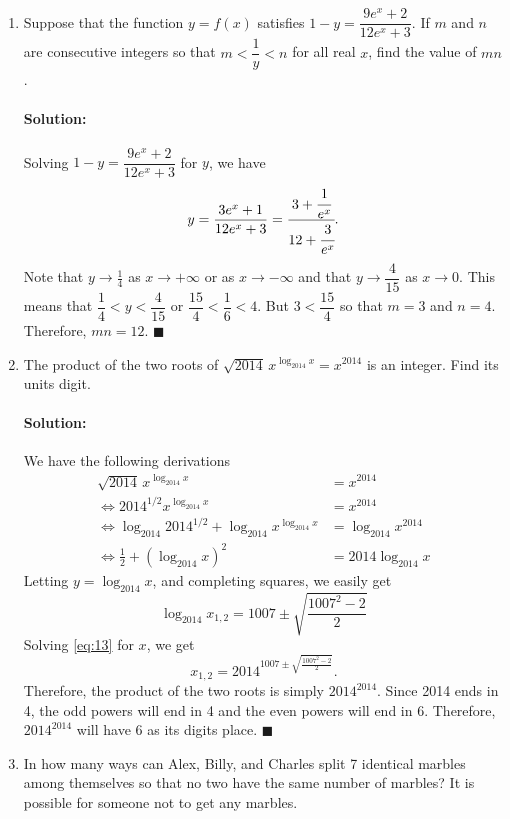 \documentclass{article}
\newenvironment{solution}{\paragraph{Solution:}}{\hfill$\blacksquare$}
\begin{document}
\begin{enumerate}
	\item Suppose that the function $y=f(x)$ satisfies $1-y=\dfrac{9e^x + 2}{12e^x+3}$. If $m$ and $n$ are consecutive integers so that $m<\dfrac{1}{y}<n$ for all real $x$, find the value of $mn$.
	
	\begin{solution}
		Solving $1-y=\dfrac{9e^x + 2}{12e^x+3}$ for $y$, we have
		\begin{equation}
			y=\dfrac{3e^x+1}{12e^x+3}=\cfrac{3+\cfrac{1}{e^x}}{12+\cfrac{3}{e^x}}.
		\end{equation}
		Note that $y\to \frac{1}{4}$ as $x\to+\infty$ or as $x\to -\infty$ and that $y\to \dfrac{4}{15}$ as $x\to 0$. This means that $\dfrac{1}{4} < y < \dfrac{4}{15}$ or $\dfrac{15}{4}<\dfrac{1}{6}<4$. But $3<\dfrac{15}{4}$ so that $m=3$ and $n=4$. Therefore, $mn=12$.
	\end{solution}

	\item The product of the two roots of $\sqrt{2014}\, x^{\log_{2014}x} = x^{2014}$ is an integer. Find its units digit.
	
	\begin{solution} We have the following derivations
		\begin{align*}
			\sqrt{2014}\, x^{\log_{2014}x} &= x^{2014}\\
			\iff 2014^{1/2}x^{\log_{2014}x} & = x^{2014}\\
			\iff \log_{2014}2014^{1/2} + \log_{2014} x^{\log_{2014}x} & = \log_{2014}x^{2014}\\
			\iff \frac{1}{2} + (\log_{2014}x)^2& = 2014\log_{2014}x
		\end{align*}
		Letting $y=\log_{2014}x$, and completing squares, we easily get
		\begin{equation}
			\log_{2014} x_{1,2} = 1007\pm\sqrt{\frac{1007^2-2}{2}}\label{eq:13}
		\end{equation}
		Solving \eqref{eq:13} for $x$, we get
		\begin{equation}
			x_{1,2} = 2014^{1007\pm\sqrt{\frac{1007^2-2}{2}}}.
		\end{equation}
		Therefore, the product of the two roots is simply $2014^{2014}$. Since 2014 ends in 4, the odd powers will end in 4 and the even powers will end in 6. Therefore, $2014^{2014}$ will have 6 as its digits place.
	\end{solution}

	\item In how many ways can Alex, Billy, and Charles split 7 identical marbles among themselves so that no two have the same number of marbles? It is possible for someone not to get any marbles.
	

\end{enumerate}
\end{document}
